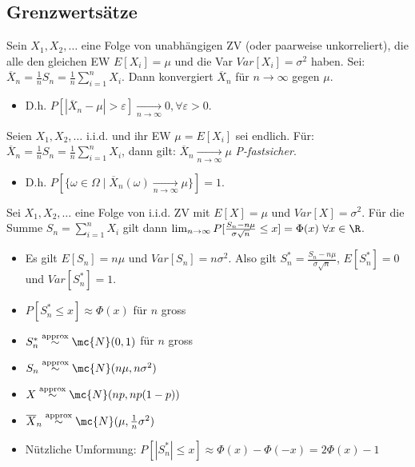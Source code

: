 \subsection{Grenzwertsätze}
\begin{itemize}
     Sein $X_1, X_2, \dots$ eine Folge von unabhängigen ZV (oder paarweise unkorreliert), die alle den gleichen EW $E[X_i] = \mu$ und die Var $Var[X_i] = \sigma^2$ haben. Sei: $\overline{X}_n = \frac{1}{n} S_n = \frac{1}{n} \sum_{i=1}^{n} X_i$. Dann konvergiert $\overline{X}_n$ für $n \to \infty$ gegen $\mu$.
        \begin{itemize}
            \item  D.h. $P[|\overline{X}_n - \mu| > \varepsilon] \underset{n \to \infty}{\to} 0, \forall \varepsilon > 0$.
        \end{itemize}
     Seien $X_1, X_2, \dots$ i.i.d. und ihr EW $\mu = E[X_i]$ sei endlich. Für: $\overline{X}_n = \frac{1}{n} S_n = \frac{1}{n} \sum_{i=1}^{n} X_i$, dann gilt: $\overline{X}_n \underset{n \to \infty}{\to} \mu$ \textit{P-fastsicher}.
        \begin{itemize}
            \item D.h. $P[\{\omega \in \Omega \mid \overline{X}_n(\omega) \underset{n \to \infty}{\to} \mu\}] = 1$.
        \end{itemize}
     Sei $X_1, X_2, \dots$ eine Folge von i.i.d. ZV mit $E[X] = \mu$ und $Var[X] = \sigma^2$. Für die Summe $S_n = \sum_{i=1}^{n} X_i$ gilt dann $\lim_{n \to \infty} P[\frac{S_n - n \mu}{\sigma \sqrt{n}} \le x] = \Phi(x) \ \forall x \in \R$.
        \begin{itemize}
            \item Es gilt $E[S_n] = n\mu$ und $Var[S_n] = n\sigma^2$. Also gilt $S_n^* = \frac{S_n - n\mu}{\sigma \sqrt{n}}$, $E[S_n^*] = 0$ und $Var[S_n^*] = 1$.
            \item $P[S_n^* \le x] \approx \Phi(x)$ für $n$ gross
            \item $S_n^* \overset{\text{approx}}{\sim} \mc{N}(0,1)$ für $n$ gross
            \item $S_n \overset{\text{approx}}{\sim} \mc{N}(n \mu, n \sigma^2)$
            \item $X \overset{\text{approx}}{\sim} \mc{N}(np, np(1-p))$
            \item $\overline{X}_n \overset{\text{approx}}{\sim} \mc{N}(\mu, \frac{1}{n} \sigma^2)$
            \item Nützliche Umformung: $P[|S_n^*| \le x] \approx \Phi(x) - \Phi(-x) = 2 \Phi(x) - 1$
        \end{itemize}
\end{itemize}
